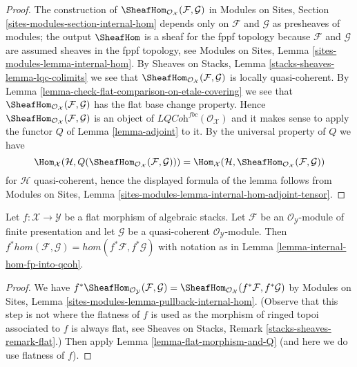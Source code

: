 \begin{proof}
The construction of
$\SheafHom_{\mathcal{O}_\mathcal{X}}(\mathcal{F}, \mathcal{G})$ in
Modules on Sites, Section \ref{sites-modules-section-internal-hom}
depends only on $\mathcal{F}$ and $\mathcal{G}$ as presheaves
of modules; the output $\SheafHom$ is a sheaf for the fppf
topology because $\mathcal{F}$ and $\mathcal{G}$ are assumed
sheaves in the fppf topology, see
Modules on Sites, Lemma \ref{sites-modules-lemma-internal-hom}.
By Sheaves on Stacks, Lemma \ref{stacks-sheaves-lemma-lqc-colimits}
we see that $\SheafHom_{\mathcal{O}_\mathcal{X}}(\mathcal{F}, \mathcal{G})$
is locally quasi-coherent.
By Lemma \ref{lemma-check-flat-comparison-on-etale-covering}
we see that $\SheafHom_{\mathcal{O}_\mathcal{X}}(\mathcal{F}, \mathcal{G})$
has the flat base change property. Hence
$\SheafHom_{\mathcal{O}_\mathcal{X}}(\mathcal{F}, \mathcal{G})$
is an object of $\textit{LQCoh}^{fbc}(\mathcal{O}_\mathcal{X})$
and it makes sense to apply the functor $Q$ of Lemma \ref{lemma-adjoint}
to it. By the universal property of $Q$ we have
$$
\Hom_\mathcal{X}(\mathcal{H},
Q(\SheafHom_{\mathcal{O}_\mathcal{X}}(\mathcal{F}, \mathcal{G}))) =
\Hom_\mathcal{X}(\mathcal{H},
\SheafHom_{\mathcal{O}_\mathcal{X}}(\mathcal{F}, \mathcal{G}))
$$
for $\mathcal{H}$ quasi-coherent, hence the displayed formula 
of the lemma follows from Modules on Sites, Lemma
\ref{sites-modules-lemma-internal-hom-adjoint-tensor}.
\end{proof}

\begin{lemma}
\label{lemma-flat-morphism-and-hom}
Let $f : \mathcal{X} \to \mathcal{Y}$ be a flat morphism of algebraic stacks.
Let $\mathcal{F}$ be an
$\mathcal{O}_\mathcal{Y}$-module of finite presentation and let
$\mathcal{G}$ be a quasi-coherent $\mathcal{O}_\mathcal{Y}$-module.
Then $f^*hom(\mathcal{F}, \mathcal{G}) = hom(f^*\mathcal{F}, f^*\mathcal{G})$
with notation as in Lemma \ref{lemma-internal-hom-fp-into-qcoh}.
\end{lemma}

\begin{proof}
We have $f^*\SheafHom_{\mathcal{O}_\mathcal{Y}}(\mathcal{F}, \mathcal{G}) =
\SheafHom_{\mathcal{O}_\mathcal{X}}(f^*\mathcal{F}, f^*\mathcal{G})$
by Modules on Sites, Lemma \ref{sites-modules-lemma-pullback-internal-hom}.
(Observe that this step is not where the flatness of $f$ is used
as the morphism of ringed topoi associated to $f$ is always flat, see
Sheaves on Stacks, Remark \ref{stacks-sheaves-remark-flat}.)
Then apply Lemma \ref{lemma-flat-morphism-and-Q} (and here we do use
flatness of $f$).
\end{proof}









